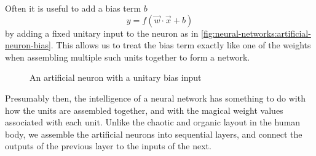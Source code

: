 Often it is useful to add a bias term $b$
\begin{equation}
    y = f(\vec w \cdot \vec x + b) \label{eq:neural-networks:ffnn-unit}
\end{equation}
by adding a fixed unitary input to the neuron as in \autoref{fig:neural-networks:artificial-neuron-bias}.
This allows us to treat the bias term exactly like one of the weights when assembling multiple such units together to form a network.
\begin{figure}[h]
    \centering
    \caption{An artificial neuron with a unitary bias input}\label{fig:neural-networks:artificial-neuron-bias}
\end{figure}

Presumably then, the intelligence of a neural network has something to do with how the units are assembled together, and with the magical weight values associated with each unit.
Unlike the chaotic and organic layout in the human body, we assemble the artificial neurons into sequential layers, and connect the outputs of the previous layer to the inputs of the next.

